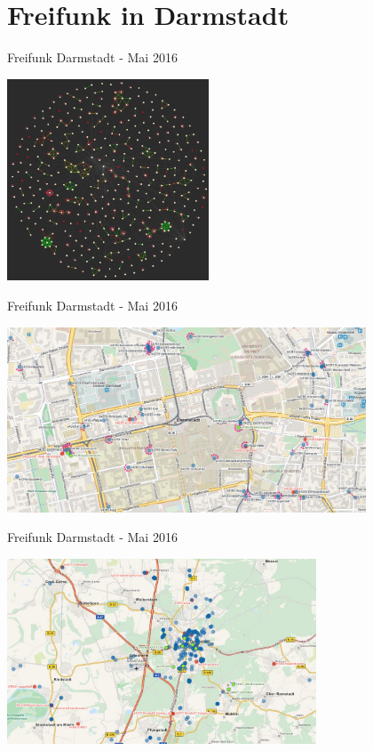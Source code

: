 \documentclass[10pt]{beamer}
\begin{document}
  \section{Freifunk in Darmstadt}

  \begin{frame}{Freifunk Darmstadt - Mai 2016}
    \begin{center}
      \includegraphics[height=6cm]{images/mesh_big}\\
    \end{center}
  \end{frame}

  \begin{frame}{Freifunk Darmstadt - Mai 2016}
    \begin{center}
      \includegraphics[height=5.5cm]{images/2016-05_map-innenstadt}\\
    \end{center}
  \end{frame}

  \begin{frame}{Freifunk Darmstadt - Mai 2016}
    \begin{center}
      \includegraphics[height=5.5cm]{images/2016-05_map-umland}\\
    \end{center}
  \end{frame}
\end{document}
